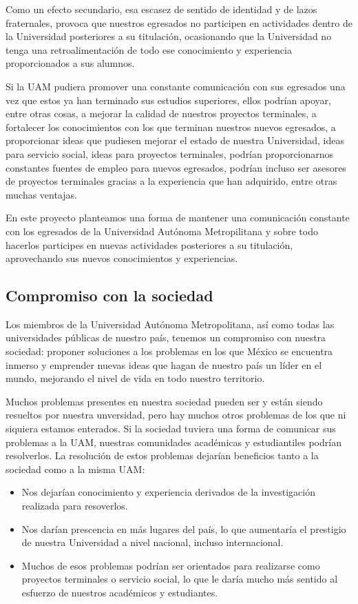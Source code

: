 \documentclass[11pt,letterpaper,titlepage]{article}
\begin{document}
Como un efecto secundario, esa escasez de sentido de identidad y de lazos fraternales, provoca que nuestros egresados no participen en actividades dentro de la Universidad posteriores a su titulaci\'on, ocasionando que la Universidad no tenga una retroalimentaci\'on de todo ese conocimiento y experiencia proporcionados a sus alumnos.

Si la UAM pudiera promover una constante comunicaci\'on con sus egresados una vez que estos ya han terminado sus estudios superiores, ellos podr\'ian apoyar, entre otras cosas, a mejorar la calidad de nuestros proyectos terminales, a fortalecer los conocimientos con los que terminan nuestros nuevos egresados, a proporcionar ideas que pudiesen mejorar el estado de nuestra Universidad, ideas para servicio social, ideas para proyectos terminales, podr\'ian proporcionarnos constantes fuentes de empleo para nuevos egresados, podr\'ian incluso ser asesores de proyectos terminales gracias a la experiencia que han adquirido, entre otras muchas ventajas.

En este proyecto planteamos una forma de mantener una comunicaci\'on constante con los egresados de la Universidad Aut\'onoma Metropilitana y sobre todo hacerlos participes en nuevas actividades posteriores a su titulaci\'on, aprovechando sus nuevos conocimientos y experiencias.

\subsection{Compromiso con la sociedad}
Los miembros de la Universidad Aut\'onoma Metropolitana, as\'i como todas las universidades p\'ublicas de nuestro pa\'is, tenemos un compromiso con nuestra sociedad: proponer soluciones a los problemas en los que M\'exico se encuentra inmerso y emprender nuevas ideas que hagan de nuestro pa\'is un l\'ider en el mundo, mejorando el nivel de vida en todo nuestro territorio.

Muchos problemas presentes en nuestra sociedad pueden ser y est\'an siendo resueltos por nuestra unversidad, pero hay muchos otros problemas de los que ni siquiera estamos enterados.
Si la sociedad tuviera una forma de comunicar sus problemas a la UAM, nuestras comunidades acad\'emicas y estudiantiles podr\'ian resolverlos. La resoluci\'on de estos problemas dejar\'ian beneficios tanto a la sociedad como a la misma UAM:
\begin{itemize}
 \item Nos dejar\'ian conocimiento y experiencia derivados de la investigaci\'on realizada para resoverlos.
 \item Nos dar\'ian prescencia en m\'as lugares del pa\'is, lo que aumentar\'ia el prestigio de nuestra Universidad a nivel nacional, incluso internacional.
 \item Muchos de esos problemas podr\'ian ser orientados para realizarse como proyectos terminales o servicio social, lo que le dar\'ia mucho m\'as sentido al esfuerzo de nuestros acad\'emicos y estudiantes.
\end{itemize}
\end{document}
